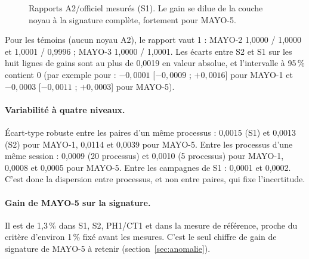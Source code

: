 \begin{figure}[ht]\centering
{}
\caption{Rapports A2/officiel mesurés (S1). Le gain se dilue de la couche noyau à la signature complète, fortement pour MAYO-5.}\label{fig:gains}
\end{figure}

\F{} Pour les témoins (aucun noyau A2), le rapport vaut 1 : MAYO-2  1,0000 / 1,0000 et  1,0001 / 0,9996 ; MAYO-3  1,0000 / 1,0001. Les écarts entre S2 et S1 sur les huit lignes de gains sont au plus de 0,0019 en valeur absolue, et l'intervalle à 95\,\% contient 0 (par exemple pour  : $-0{,}0001$ [$-0{,}0009$ ; $+0{,}0016$] pour MAYO-1 et $-0{,}0003$ [$-0{,}0011$ ; $+0{,}0003$] pour MAYO-5).

\paragraph{Variabilité à quatre niveaux.} Écart-type robuste entre les paires d'un même processus : 0,0015 (S1) et 0,0013 (S2) pour MAYO-1, 0,0114 et 0,0039 pour MAYO-5. Entre les processus d'une même session : 0,0009 (20 processus) et 0,0010 (5 processus) pour MAYO-1, 0,0008 et 0,0005 pour MAYO-5. Entre les campagnes de S1 : 0,0001 et 0,0002. C'est donc la dispersion entre processus, et non entre paires, qui fixe l'incertitude.

\paragraph{Gain de MAYO-5 sur la signature.} \F{} Il est de 1,3\,\% dans S1, S2, PH1/CT1 et dans la mesure de référence, proche du critère d'environ 1\,\% fixé avant les mesures. C'est le seul chiffre de gain de signature de MAYO-5 à retenir (section~\ref{sec:anomalie}).

